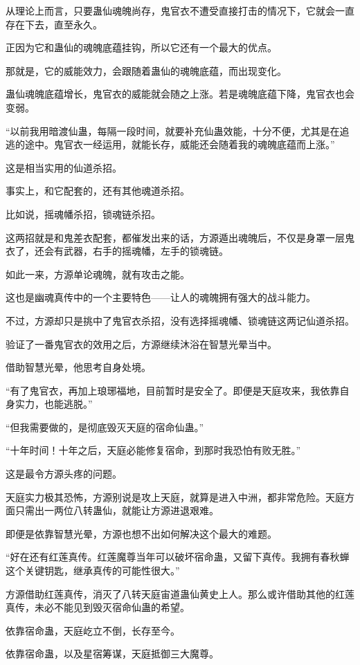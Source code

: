 \begin{this_body}
从理论上而言，只要蛊仙魂魄尚存，鬼官衣不遭受直接打击的情况下，它就会一直存在下去，直至永久。

正因为它和蛊仙的魂魄底蕴挂钩，所以它还有一个最大的优点。

那就是，它的威能效力，会跟随着蛊仙的魂魄底蕴，而出现变化。

蛊仙魂魄底蕴增长，鬼官衣的威能就会随之上涨。若是魂魄底蕴下降，鬼官衣也会变弱。

“以前我用暗渡仙蛊，每隔一段时间，就要补充仙蛊效能，十分不便，尤其是在追逃的途中。鬼官衣一经运用，就能长存，威能还会随着我的魂魄底蕴而上涨。”

这是相当实用的仙道杀招。

事实上，和它配套的，还有其他魂道杀招。

比如说，摇魂幡杀招，锁魂链杀招。

这两招就是和鬼差衣配套，都催发出来的话，方源遁出魂魄后，不仅是身罩一层鬼衣了，还会有武器，右手的摇魂幡，左手的锁魂链。

如此一来，方源单论魂魄，就有攻击之能。

这也是幽魂真传中的一个主要特色——让人的魂魄拥有强大的战斗能力。

不过，方源却只是挑中了鬼官衣杀招，没有选择摇魂幡、锁魂链这两记仙道杀招。

验证了一番鬼官衣的效用之后，方源继续沐浴在智慧光晕当中。

借助智慧光晕，他思考自身处境。

“有了鬼官衣，再加上琅琊福地，目前暂时是安全了。即便是天庭攻来，我依靠自身实力，也能逃脱。”

“但我需要做的，是彻底毁灭天庭的宿命仙蛊。”

“十年时间！十年之后，天庭必能修复宿命，到那时我恐怕有败无胜。”

这是最令方源头疼的问题。

天庭实力极其恐怖，方源别说是攻上天庭，就算是进入中洲，都非常危险。天庭方面只需出一两位八转蛊仙，就能让方源进退艰难。

即便是依靠智慧光晕，方源也想不出如何解决这个最大的难题。

“好在还有红莲真传。红莲魔尊当年可以破坏宿命蛊，又留下真传。我拥有春秋蝉这个关键钥匙，继承真传的可能性很大。”

方源借助红莲真传，消灭了八转天庭宙道蛊仙黄史上人。那么或许借助其他的红莲真传，未必不能见到毁灭宿命仙蛊的希望。

依靠宿命蛊，天庭屹立不倒，长存至今。

依靠宿命蛊，以及星宿筹谋，天庭抵御三大魔尊。


\end{this_body}
